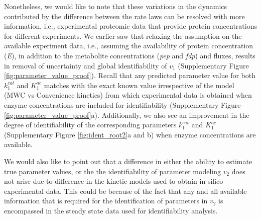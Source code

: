\documentclass[10pt]{article}
\begin{document}
	Nonetheless, we would like to note that these variations in the dynamics contributed by the difference between the rate laws can be resolved with more information, i.e., experimental proteomic data that provide protein concentrations for different experiments. We earlier saw that relaxing the assumption on the available experiment data, i.e., assuming the availability of protein concentration (\textit{E}), in addition to the metabolite concentrations (\textit{pep} and \textit{fdp}) and fluxes, results in removal of uncertainty and global identifiability of $v_1$ (Supplementary Figure \ref{fig:parameter_value_proof}). Recall that any predicted parameter value for both $k_1^{cat}$ and $K_1^{ac}$ matches with the exact known value irrespective of the model (MWC vs Convenience kinetics) from which experimental data is obtained when enzyme concentrations are included for identifiability (Supplementary Figure \ref{fig:parameter_value_proof}a).  Additionally, we also see an improvement in the degree of identifiability of the corresponding parameters $k_1^{cat}$ and $K_1^{ac}$ (Supplementary Figure \ref{fig:ident_root2}a and b) when enzyme concentrations are available. 
	
	We would also like to point out that a difference in either the ability to estimate true parameter values, or the the identifiability of parameter modeling $v_2$ does not arise due to difference in the kinetic models used to obtain in silico experimental data. This could be because of the fact that any and all available information that is required for the identification of parameters in $v_2$ is encompassed in the steady state data used for identifiability analysis.
	
\end{document}
